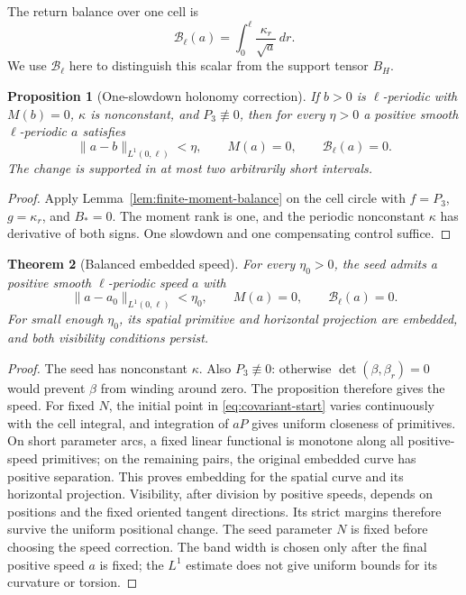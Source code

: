 \documentclass[11pt]{amsart}
\newtheorem{theorem}{Theorem}[section]
\newtheorem{proposition}[theorem]{Proposition}
\theoremstyle{definition}
\theoremstyle{remark}
\numberwithin{equation}{section}
\begin{document}
The return balance over one cell is
\begin{equation}\label{eq:balance-moment}
 \mathscr B_\ell(a)=\int_0^\ell\frac{\kappa_r}{\sqrt a}\,dr.
\end{equation}
We use $\mathscr B_\ell$ here to distinguish this scalar from the support
tensor $B_H$.

\begin{proposition}[One-slowdown holonomy correction]\label{prop:one-slowdown}
If $b>0$ is $\ell$-periodic with $M(b)=0$, $\kappa$ is nonconstant,
and $P_3\not\equiv0$, then for every $\eta>0$ a positive smooth
$\ell$-periodic $a$ satisfies
\[
 \|a-b\|_{L^1(0,\ell)}<\eta,\qquad M(a)=0,
 \qquad\mathscr B_\ell(a)=0.
\]
The change is supported in at most two arbitrarily short intervals.
\end{proposition}
\begin{proof}
Apply Lemma~\ref{lem:finite-moment-balance} on the cell circle with
$f=P_3$, $g=\kappa_r$, and $B_*=0$. The moment rank is one, and the
periodic nonconstant $\kappa$ has derivative of both signs. One slowdown
and one compensating control suffice.
\end{proof}

\begin{theorem}[Balanced embedded speed]\label{thm:spike}\label{lem:speed}
For every $\eta_0>0$, the seed admits a positive smooth $\ell$-periodic
speed $a$ with
\begin{equation}\label{eq:balanced-speed}
 \|a-a_0\|_{L^1(0,\ell)}<\eta_0,\qquad
 M(a)=0,\qquad\mathscr B_\ell(a)=0.
\end{equation}
For small enough $\eta_0$, its spatial primitive and horizontal
projection are embedded, and both visibility conditions persist.
\end{theorem}
\begin{proof}
The seed has nonconstant $\kappa$. Also $P_3\not\equiv0$: otherwise
$\det(\beta,\beta_r)=0$ would prevent $\beta$ from winding around zero.
The proposition therefore gives the speed. For fixed $N$, the initial
point in \eqref{eq:covariant-start} varies continuously with the cell
integral, and integration of $aP$ gives uniform closeness of primitives.
On short parameter arcs, a fixed linear functional is monotone along all
positive-speed primitives; on the remaining pairs, the original embedded
curve has positive separation. This proves embedding for the spatial
curve and its horizontal projection. Visibility, after division by positive
speeds, depends on positions and the fixed oriented tangent directions.
Its strict margins therefore survive the uniform positional change.
The seed parameter $N$ is fixed before choosing the speed correction.
The band width is chosen only after the final positive speed $a$ is
fixed; the $L^1$ estimate does not give uniform bounds for its curvature
or torsion.
\end{proof}
\end{document}
